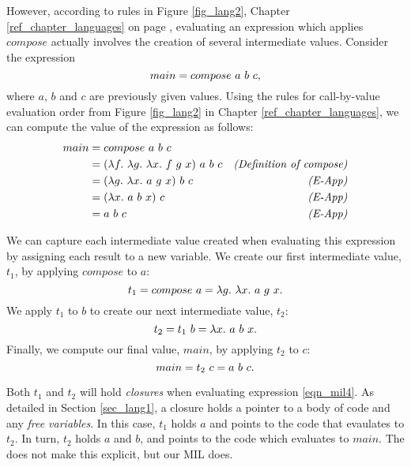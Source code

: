 \documentclass[12pt]{report}
\begin{document}
However, according to rules in Figure \ref{fig_lang2}, Chapter
\ref{ref_chapter_languages} on page \pageref{fig_lang2}, evaluating an
expression which applies $compose$ actually involves the creation of
several intermediate values. Consider the expression 
\begin{equation}
  main = compose\ a\ b\ c, \label{eqn_mil4}
\end{equation}
where $a$, $b$ and $c$ are previously given values. Using the
rules for call-by-value evaluation order from Figure \ref{fig_lang2} in 
Chapter \ref{ref_chapter_languages}, we can compute the value of the expression
as follows:
\begin{align}
  main &= compose\ a\ b\ c \\
  &= (\lambda f.\ \lambda g.\ \lambda x.\ f\ g\ x)\ a\ b\ c & \text{\emph{(Definition of compose)}} \\
  &= (\lambda g.\ \lambda x.\ a\ g\ x)\ b\ c & \text{\emph{(E-App)}} \\
  &= (\lambda x.\ a\ b\ x)\ c & \text{\emph{(E-App)}} \\
  &= a\ b\ c & \text{\emph{(E-App)}} 
\end{align}

We can capture each intermediate value created when evaluating this
expression by assigning each result to a new variable. 
We create our first intermediate value, $t_1$, by applying $compose$ to $a$:
\begin{equation}
  t_1 = compose\ a = \lambda g.\ \lambda x.\ a\ g\ x. \label{eqn_mil1}
\end{equation}
We apply $t_1$ to $b$ to create our next intermediate value, $t_2$:
\begin{equation}
  t_2 = t_1\ b = \lambda x.\ a\ b\ x. \label{eqn_mil2}
\end{equation}
Finally, we compute our final value, $main$, by applying $t_2$ to $c$:
\begin{equation}
  main = t_2\ c = a\ b\ c. \label{eqn_mil3}  
\end{equation}

Both $t_1$ and $t_2$ will hold \emph{closures} when evaluating
expression \eqref{eqn_mil4}. As detailed in Section \ref{sec_lang1}, a closure
holds a pointer to a body of code and any \emph{free variables}. In this case,
$t_1$ holds $a$ and points to the code that evaulates to $t_2$. In turn, $t_2$
holds $a$ and $b$, and points to the code which evaluates to $main$. The
\lamA does not make this explicit, but our MIL does. 
\end{document}
